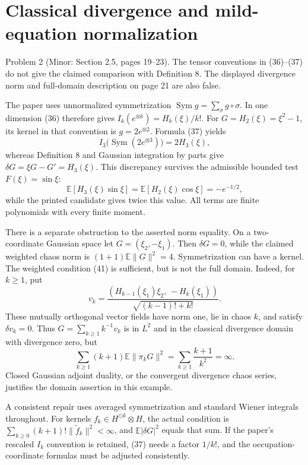 \documentclass[10pt]{article}
\begin{document}
\section*{Classical divergence and mild-equation normalization}
Problem 2 (Minor: Section 2.5, pages 19–23).  The tensor conventions in (36)–(37) do not give the claimed comparison with Definition 8. The displayed divergence norm and full-domain description on page 21 are also false.\par
The paper uses unnormalized symmetrization \(\operatorname{Sym}g=\sum_{\sigma}g\circ\sigma\). In one dimension (36) therefore gives \(I_k(e^{\otimes k})=H_k(\xi)/k!\). For \(G=H_2(\xi)=\xi^2-1\), its kernel in that convention is \(g=2e^{\otimes2}\). Formula (37) yields \[I_3\bigl(\operatorname{Sym}(2e^{\otimes3})\bigr)=2H_3(\xi),\] whereas Definition 8 and Gaussian integration by parts give \(\delta G=\xi G-G'=H_3(\xi)\). This discrepancy survives the admissible bounded test \(F(\xi)=\sin\xi\): \[\mathbb E[H_3(\xi)\sin\xi]
 =\mathbb E[H_2(\xi)\cos\xi]=-e^{-1/2},\] while the printed candidate gives twice this value. All terms are finite polynomials with every finite moment.\par
There is a separate obstruction to the asserted norm equality. On a two-coordinate Gaussian space let \(G=(\xi_2,-\xi_1)\). Then \(\delta G=0\), while the claimed weighted chaos norm is \((1+1)\mathbb E\|G\|^2=4\). Symmetrization can have a kernel. The weighted condition (41) is sufficient, but is not the full domain. Indeed, for \(k\ge1\), put \[v_k=
 \frac{(H_{k-1}(\xi_1)\xi_2,\,-H_k(\xi_1))}
 {\sqrt{(k-1)!+k!}} .\] These mutually orthogonal vector fields have norm one, lie in chaos \(k\), and satisfy \(\delta v_k=0\). Thus \(G=\sum_{k\ge1}k^{-1}v_k\) is in \(L^2\) and in the classical divergence domain with divergence zero, but \[\sum_{k\ge1}(k+1)\mathbb E\|\pi_kG\|^2
 =\sum_{k\ge1}\frac{k+1}{k^2}=\infty.\] Closed Gaussian adjoint duality, or the convergent divergence chaos series, justifies the domain assertion in this example.\par
A consistent repair uses averaged symmetrization and standard Wiener integrals throughout. For kernels \(f_k\in H^{\odot k}\otimes H\), the actual condition is \(\sum_{k\ge0}(k+1)!\|\widetilde f_k\|^2<\infty\), and \(\mathbb E|\delta G|^2\) equals that sum. If the paper’s rescaled \(I_k\) convention is retained, (37) needs a factor \(1/k!\), and the occupation-coordinate formulas must be adjusted consistently.\par
\end{document}
